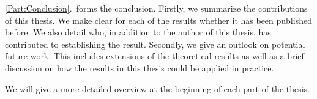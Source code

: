 \documentclass[../../diss.tex]{subfiles}
\begin{document}
\cref{Part:Conclusion}.~forms the conclusion.
Firstly, we summarize the contributions of this thesis.
We make clear for each of the results whether it has been published before.
We also detail who, in addition to the author of this thesis, has contributed to establishing the result.
Secondly, we give an outlook on potential future work.
This includes extensions of the theoretical results as well as a brief discussion on how the results in this thesis could be applied in practice.

We will give a more detailed overview at the beginning of each part of the thesis.
\end{document}
